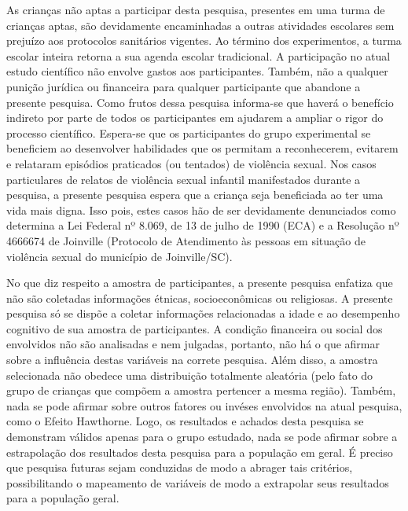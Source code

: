 As crianças não aptas a participar desta pesquisa, presentes em uma turma de crianças aptas, são devidamente encaminhadas a outras atividades escolares sem prejuízo aos protocolos sanitários vigentes. %
Ao término dos experimentos, a turma escolar inteira retorna a sua agenda escolar tradicional. A participação no atual estudo científico não envolve gastos aos participantes. Também, não a qualquer punição jurídica ou financeira para qualquer participante que abandone a presente pesquisa. Como frutos dessa pesquisa informa-se que haverá o benefício indireto por parte de todos os participantes em ajudarem a ampliar o rigor do processo científico. Espera-se que os participantes do grupo experimental se beneficiem ao desenvolver habilidades que os permitam a reconhecerem, evitarem e relataram episódios praticados (ou tentados) de violência sexual. Nos casos particulares de relatos de violência sexual infantil manifestados durante a pesquisa, a presente pesquisa espera que a criança seja beneficiada ao ter uma vida mais digna. Isso pois, estes casos hão de ser devidamente denunciados como determina a Lei Federal nº 8.069, de 13 de julho de 1990 (\ac{ECA}) e a Resolução nº 4666674 de Joinville (Protocolo de Atendimento às pessoas em situação de violência sexual do município de Joinville/SC). 

No que diz respeito a amostra de participantes, a presente pesquisa enfatiza que não são coletadas informações étnicas, socioeconômicas ou religiosas. A presente pesquisa só se dispõe a coletar informações relacionadas a idade e ao desempenho cognitivo de sua amostra de participantes. A condição financeira ou social dos envolvidos não são analisadas e nem julgadas, portanto, não há o que afirmar sobre a influência destas variáveis na correte pesquisa. Além disso, a amostra selecionada não obedece uma distribuição totalmente aleatória (pelo fato do grupo de crianças que compõem a amostra pertencer a mesma região). Também, nada se pode afirmar sobre outros fatores ou invéses envolvidos na atual pesquisa, como o Efeito Hawthorne. Logo, os resultados e achados desta pesquisa se demonstram válidos apenas para o grupo estudado, nada se pode afirmar sobre a estrapolação dos resultados desta pesquisa para a população em geral. É preciso que pesquisa futuras sejam conduzidas de modo a abrager tais critérios, possibilitando o mapeamento de variáveis de modo a extrapolar seus resultados para a população geral. 

